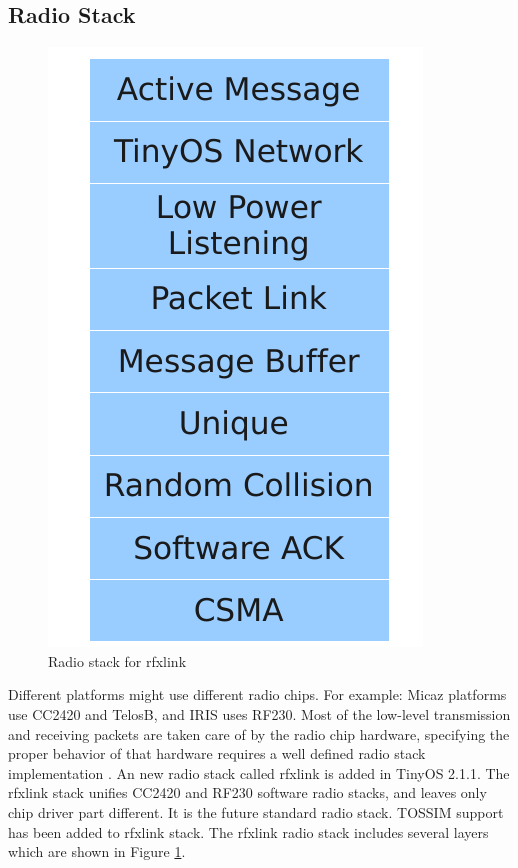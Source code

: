 \subsection{Radio Stack}
\label{Sim:radio stack}
\begin{figure}[htbp]
  \begin{center}
    \leavevmode
      \includegraphics[scale=0.45]{Pics/Rfxlinklayer.pdf}
   \caption{Radio stack for rfxlink}
    \label{fig:rfxlinklayer}
  \end{center}
\end{figure}
Different platforms might use different radio chips. For example: Micaz platforms use CC2420 and TelosB, and IRIS uses RF230. Most of the low-level transmission and receiving packets are taken care of by the radio chip hardware, specifying the proper behavior of that hardware requires a well defined radio stack implementation \cite{TEP 126}. 
An new radio stack called rfxlink is added in TinyOS 2.1.1. The rfxlink stack unifies CC2420 and RF230 software radio stacks, and leaves only chip driver part different. It is the future standard radio stack. TOSSIM support has been added to rfxlink stack.
The rfxlink radio stack includes several layers which are shown in Figure \ref{fig:rfxlinklayer}. 
